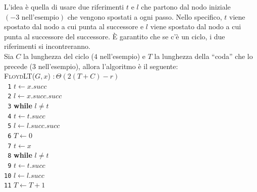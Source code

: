 \documentclass[10pt,landscape]{article}
\begin{document}
\begin{multicols*}{4}
\begin{center}
                \end{center}
                L'idea è quella di usare due riferimenti $t$ e $l$ che partono dal nodo iniziale $(-3 \text{ nell'esempio})$ che vengono spostati a ogni passo. Nello specifico, $t$ viene spostato dal nodo a cui punta al successore e $l$ viene spostato dal nodo a cui punta al successore del successore. È garantito che se c'è un ciclo, i due riferimenti si incontreranno. \\ [3pt]
                Sia $C$ la lunghezza del ciclo ($4$ nell'esempio) e $T$ la lunghezza della ``coda'' che lo precede (3 nell'esempio), allora l'algoritmo è il seguente: \\ [5pt]
                \textsc{FloydLT($G,x$)} $: \Theta(2(T+C)-r)$\\ [3pt]
                \verb| 1|\hspace*{0.5em} $t \leftarrow x.succ$\\
                \verb| 2|\hspace*{0.5em} $l \leftarrow x.succ.succ$\\
                \verb| 3|\hspace*{0.5em} \textbf{while} $l \ne t$\\
                \verb| 4|\hspace*{1.5em} $t \leftarrow t.succ$\\
                \verb| 5|\hspace*{1.5em} $l \leftarrow l.succ.succ$\\
                \verb| 6|\hspace*{0.5em} $T \leftarrow 0$\\
                \verb| 7|\hspace*{0.5em} $t \leftarrow x$\\
                \verb| 8|\hspace*{0.5em} \textbf{while} $l \ne t$\\
                \verb| 9|\hspace*{1.5em} $t \leftarrow t.succ$\\
                \verb|10|\hspace*{1.5em} $l \leftarrow l.succ$\\
                \verb|11|\hspace*{1.5em} $T \leftarrow T + 1$\\

\end{multicols*}
\end{document}
